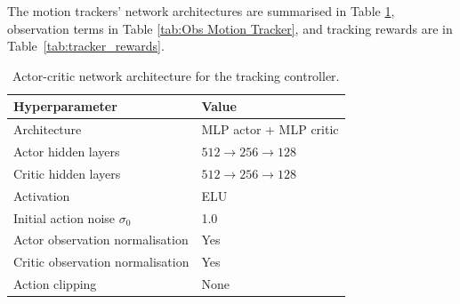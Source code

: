 \documentclass{article}
\begin{document}
The motion trackers' network architectures are summarised in Table \ref{tab:actor_critic}, observation terms in Table \ref{tab:Obs Motion Tracker}, and tracking rewards are in Table~\ref{tab:tracker_rewards}.

\begin{table}[h]
\centering
\caption{Actor-critic network architecture for the tracking controller.}
\small
\begin{tabular}{@{}ll@{}}
\toprule
Hyperparameter & Value \\
\midrule
Architecture & MLP actor + MLP critic \\
Actor hidden layers & $512 \to 256 \to 128$ \\
Critic hidden layers & $512 \to 256 \to 128$ \\
Activation & ELU \\
Initial action noise $\sigma_0$ & 1.0 \\
Actor observation normalisation & Yes \\
Critic observation normalisation & Yes \\
Action clipping & None \\
\bottomrule
\end{tabular}
\label{tab:actor_critic}
\end{table}
\end{document}
